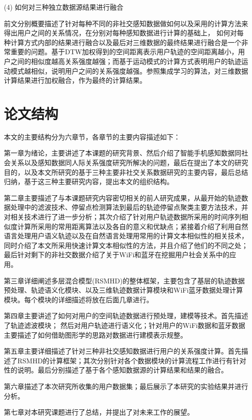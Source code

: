 \par (4) 如何对三种独立数据源结果进行融合
\par 前文分别概要描述了针对每种不同的非社交感知数据做如何以及采用的计算方法来得出用户之间的关系情况，在分别对每种感知数据进行计算的基础上， 如何对每种计算方式内部的结果进行融合以及最后对三维数据的最终结果进行融合是一个非常重要的问题。基于DTW加权得到的空间距离表示用户轨迹的空间距离越小，用户之间的相似度越高关系强度越强；而基于运动模式的计算方式表明用户的轨迹运动模式越相似，说明用户之间的关系强度越强。参照集成学习的算法，对三维数据计算结果进行加权融合，作为最终的计算结果。
\section{论文结构}
本文的主要结构分为六章节，各章节的主要内容描述如下：
\par 第一章为绪论，主要讲述了本课题的研究背景、然后介绍了智能手机感知数据同社会关系以及感知数据同人际关系强度研究所解决的问题，最后在提出了本文的研究目的，以及本文所研究的基于三种主要非社交关系数据研究的主要内容，最后总结归纳，基于这三种主要研究内容，提出本文的组织结构。
\par 第二章主要描述了与本课题研究内容密切相关的前人研究成果，从最开始的轨迹数据处理中的滤波技术、停留点检测算法到最后的轨迹停留点聚类主要方法技术，并对相关技术进行了进一步分析；其次介绍了针对用户轨迹数据所采用的时间序列相似度计算所采用的常用距离算法以及各自的意义和优缺点；紧接着介绍了利用自然语言处理用户语义轨迹以及在自然语言处理用常用的计算文本相似性的相关技术，同时介绍了本文所采用快速计算文本相似性的方法，并且介绍了他们的不同之处；最后针对剩下的非社交数据介绍了关于WiFi和蓝牙在挖掘用户社会关系中的应用。
\par 第三章详细阐述多层混合模型(RSMHD)的整体框架，主要包含了基层的轨迹数据预处理、轨迹语义化模块、以及三维轨迹数据计算模块和WiFi蓝牙数据处理计算模块。每个模块的详细描述将放在后面几章进行。
\par 第四章主要讲述了如何对用户的空间轨迹数据进行预处理，建模等技术。首先描述了轨迹滤波模块；%
然后对用户轨迹进行语义化；针对用户的WiFi数据和蓝牙数据主要描述了如何借助图形学的思路对数据进行建模表示规整。
\par 第五章主要详细描述了针对三种非社交感知数据进行用户的关系强度计算。首先描述了RSMHD的计算框架；其次分别针对各个数据模块的计算流程工作进行有针对性的说明。最后分别描述了基于各个感知数据源的计算结果和结果的融合。
\par 第六章描述了本次研究所收集的用户数据集；最后展示了本研究的实验结果并进行分析。
\par 第七章对本研究课题进行了总结，并提出了对未来工作的展望。
